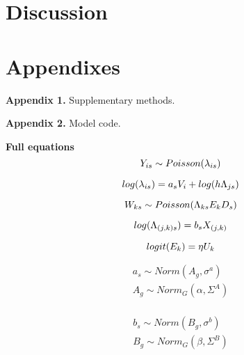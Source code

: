 \documentclass[10pt,a4paper,draft]{article}
\begin{document}
\section{Discussion}






\section{Appendixes}
\textbf{Appendix 1.} Supplementary methods.  

\textbf{Appendix 2.} Model code.

\textbf{Full equations}  
\begin{equation}
  Y_{is} \sim Poisson(\lambda_{is}) \\
\end{equation}

\begin{equation}
  log(\lambda_{is}) = a_s V_i + log(h\Lambda_{js}) \\
\end{equation}

\begin{equation}
  W_{ks} \sim Poisson(\Lambda_{ks}E_kD_s) \\
\end{equation}

\begin{equation}
  log(\Lambda_{(j,k)s}) = b_s X_{(j,k)} \\
\end{equation}

\begin{equation}
  logit(E_k) = \eta U_k \\
\end{equation}

\begin{equation}
  \begin{gathered}
    a_s \sim Norm(A_g, \sigma^a) \\
    A_g \sim Norm_G(\alpha, \Sigma^A) \\
  \end{gathered}
\end{equation}

\begin{equation}
  \begin{gathered}
    b_s \sim Norm(B_g, \sigma^b) \\
    B_g \sim Norm_G(\beta, \Sigma^B) \\
  \end{gathered}
\end{equation}
\end{document}
